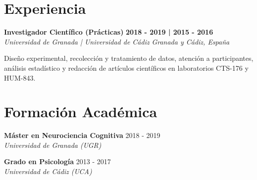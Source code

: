 \documentclass[letterpaper,11pt]{article}
\begin{document}
\section{Experiencia}

    \noindent
    \begin{minipage}[t]{0.99\textwidth}
        {\large \textbf{Investigador Científico (Prácticas)}} 
        \hfill 
        {\small \textbf{2018 - 2019 | 2015 - 2016}} \\
        
        {\color{detailgray}\textit{Universidad de Granada | Universidad de Cádiz}} 
        \hfill 
        {\color{detailgray}\small \textit{Granada y Cádiz, España}}
    \end{minipage}
    
    \vspace{0.1cm}
    
    {\small Diseño experimental, recolección y tratamiento de datos, atención a participantes, análisis estadístico y redacción de artículos científicos en laboratorios CTS-176 y HUM-843.}
    
    \vspace{0.4cm}

\section{Formación Académica}
    \noindent
    \begin{minipage}[t]{1.0\linewidth}
        {\textbf{Máster en Neurociencia Cognitiva}} 
        \hfill 
        {\small 2018 - 2019} \\
        {\color{detailgray}\textit{Universidad de Granada (UGR)}}
    \end{minipage}
    \par 
    \vspace{0.2cm} 
    \noindent
    \begin{minipage}[t]{1.0\linewidth}
        {\textbf{Grado en Psicología}} 
        \hfill 
        {\small 2013 - 2017} \\
        {\color{detailgray}\textit{Universidad de Cádiz (UCA)}}
    \end{minipage}
    \par 
    \vspace{0.2cm} 
\end{document}

